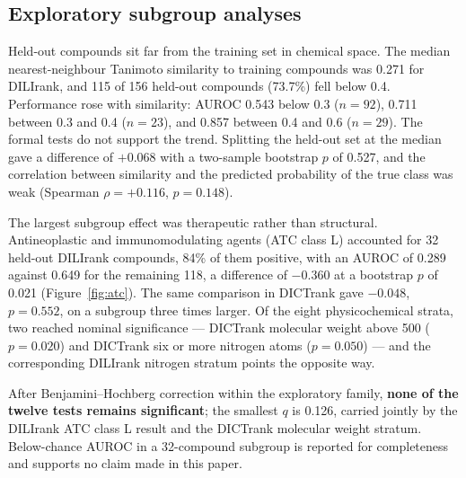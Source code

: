 \subsection{Exploratory subgroup analyses}

Held-out compounds sit far from the training set in chemical space. The median
nearest-neighbour Tanimoto similarity to training compounds was 0.271 for
DILIrank, and 115 of 156 held-out compounds (73.7\%) fell below 0.4. Performance
rose with similarity: AUROC 0.543 below 0.3 ($n = 92$), 0.711 between 0.3 and 0.4
($n = 23$), and 0.857 between 0.4 and 0.6 ($n = 29$). The formal tests do not
support the trend. Splitting the held-out set at the median gave a difference of
$+0.068$ with a two-sample bootstrap $p$ of 0.527, and the correlation between
similarity and the predicted probability of the true class was weak
(Spearman $\rho = +0.116$, $p = 0.148$).

The largest subgroup effect was therapeutic rather than structural. Antineoplastic
and immunomodulating agents (ATC class L) accounted for 32 held-out DILIrank
compounds, 84\% of them positive, with an AUROC of 0.289 against 0.649 for the
remaining 118, a difference of $-0.360$ at a bootstrap $p$ of 0.021
(Figure~\ref{fig:atc}). The same comparison in DICTrank gave $-0.048$,
$p = 0.552$, on a subgroup three times larger. Of the eight physicochemical
strata, two reached nominal significance --- DICTrank molecular weight above 500
($p = 0.020$) and DICTrank six or more nitrogen atoms ($p = 0.050$) --- and the
corresponding DILIrank nitrogen stratum points the opposite way.

After Benjamini--Hochberg correction within the exploratory family,
\textbf{none of the twelve tests remains significant}; the smallest $q$ is 0.126,
carried jointly by the DILIrank ATC class L result and the DICTrank molecular
weight stratum. Below-chance AUROC in a 32-compound subgroup is reported for
completeness and supports no claim made in this paper.
